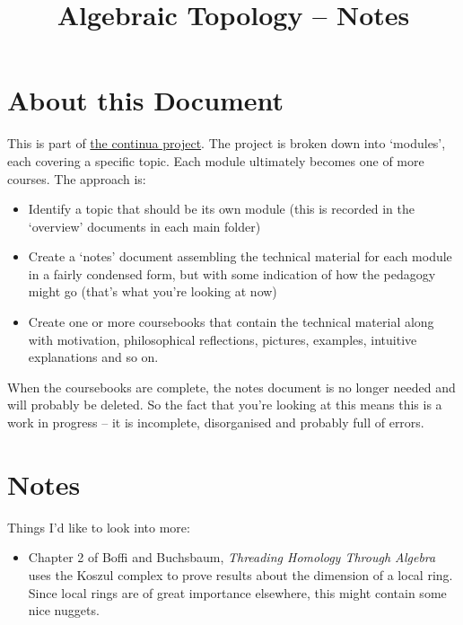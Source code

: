 \documentclass[oneside,english]{amsbook}
\numberwithin{section}{chapter}
\theoremstyle{plain}
\theoremstyle{definition}
\begin{document}
	
	\title{Algebraic Topology -- Notes}
	
	\maketitle
	
	\tableofcontents
	
	\chapter*{About this Document}
	
	This is part of \href{https://github.com/FineArtMaths/continua}{the continua project}. The project is broken down into `modules', each covering a specific topic. Each module ultimately becomes one of more courses. The approach is:
	
	\begin{itemize}
		\item{Identify a topic that should be its own module (this is recorded in the `overview' documents in each main folder)}
		\item{Create a `notes' document assembling the technical material for each module in a fairly condensed form, but with some indication of how the pedagogy might go (that's what you're looking at now)}
		\item{Create one or more coursebooks that contain the technical material along with motivation, philosophical reflections, pictures, examples, intuitive explanations and so on.}
	\end{itemize}
	
	When the coursebooks are complete, the notes document is no longer needed and will probably be deleted. So the fact that you're looking at this means this is a work in progress -- it is incomplete, disorganised and probably full of errors.

	\chapter*{Notes}
	
		Things I'd like to look into more:
		\begin{itemize}
			\item Chapter 2 of Boffi and Buchsbaum, \textit{Threading Homology Through Algebra} uses the Koszul complex to prove results about the dimension of a local ring. Since local rings are of great importance elsewhere, this might contain some nice nuggets.
		\end{itemize}
\end{document}
